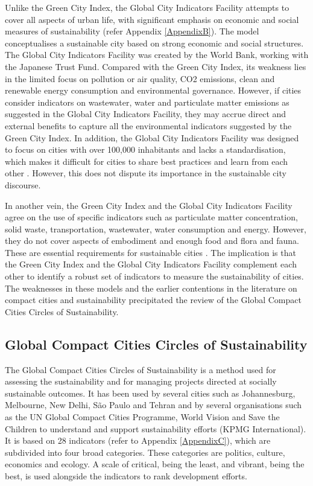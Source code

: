 Unlike the Green City Index, the Global City Indicators Facility attempts to cover all aspects of urban life, with significant emphasis on economic and social measures of sustainability (refer Appendix \ref{AppendixB}). The model conceptualises a sustainable city based on strong economic and social structures. The Global City Indicators Facility was created by the World Bank, working with the Japanese Trust Fund. Compared with the Green City Index, its weakness lies in the limited focus on pollution or air quality, CO2 emissions, clean and renewable energy consumption and environmental governance. However, if cities consider indicators on wastewater, water and particulate matter emissions as suggested in the Global City Indicators Facility, they may accrue direct and external benefits to capture all the environmental indicators suggested by the Green City Index. In addition, the Global City Indicators Facility was designed to focus on cities with over 100,000 inhabitants and lacks a standardisation, which makes it difficult for cities to share best practices and learn from each other \cite{Mccarney2009}. However, this does not dispute its importance in the sustainable city discourse.

In another vein, the Green City Index and the Global City Indicators Facility agree on the use of specific indicators such as particulate matter concentration, solid waste, transportation, wastewater, water consumption and energy. However, they do not cover aspects of embodiment and enough food and flora and fauna. These are essential requirements for sustainable cities \cite{Ackerman2014, Opitz2016, Specht2014}. The implication is that the Green City Index and the Global City Indicators Facility complement each other to identify a robust set of indicators to measure the sustainability of cities. The weaknesses in these models and the earlier contentions in the literature on compact cities and sustainability precipitated the review of the Global Compact Cities Circles of Sustainability.

\subsection{Global Compact Cities Circles of Sustainability}

The Global Compact Cities Circles of Sustainability is a method used for assessing the sustainability and for managing projects directed at socially sustainable outcomes. It has been used by several cities such as Johannesburg, Melbourne, New Delhi, São Paulo and Tehran and by several organisations such as the UN Global Compact Cities Programme, World Vision and Save the Children to understand and support sustainability efforts (KPMG International). It is based on 28 indicators (refer to Appendix \ref{AppendixC}), which are subdivided into four broad categories. These categories are politics, culture, economics and ecology. A scale of critical, being the least, and vibrant, being the best, is used alongside the indicators to rank development efforts.

